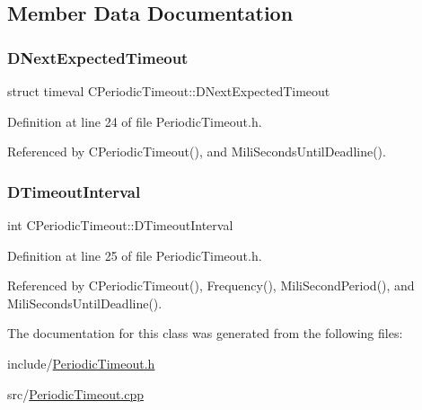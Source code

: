 \subsection{Member Data Documentation}
\hypertarget{classCPeriodicTimeout_ae85c3dd7526ee6b538b7c6478133013c}{}\label{classCPeriodicTimeout_ae85c3dd7526ee6b538b7c6478133013c} 
\subsubsection{\texorpdfstring{D\+Next\+Expected\+Timeout}{DNextExpectedTimeout}}
{\footnotesize\ttfamily struct timeval C\+Periodic\+Timeout\+::\+D\+Next\+Expected\+Timeout\hspace{0.3cm}{\ttfamily [protected]}}



Definition at line 24 of file Periodic\+Timeout.\+h.



Referenced by C\+Periodic\+Timeout(), and Mili\+Seconds\+Until\+Deadline().

\hypertarget{classCPeriodicTimeout_ab0c2b821c02366c9638a66eced3c1f34}{}\label{classCPeriodicTimeout_ab0c2b821c02366c9638a66eced3c1f34} 
\subsubsection{\texorpdfstring{D\+Timeout\+Interval}{DTimeoutInterval}}
{\footnotesize\ttfamily int C\+Periodic\+Timeout\+::\+D\+Timeout\+Interval\hspace{0.3cm}{\ttfamily [protected]}}



Definition at line 25 of file Periodic\+Timeout.\+h.



Referenced by C\+Periodic\+Timeout(), Frequency(), Mili\+Second\+Period(), and Mili\+Seconds\+Until\+Deadline().



The documentation for this class was generated from the following files\+:\begin{DoxyCompactItemize}
\item 
include/\hyperlink{PeriodicTimeout_8h}{Periodic\+Timeout.\+h}\item 
src/\hyperlink{PeriodicTimeout_8cpp}{Periodic\+Timeout.\+cpp}\end{DoxyCompactItemize}
